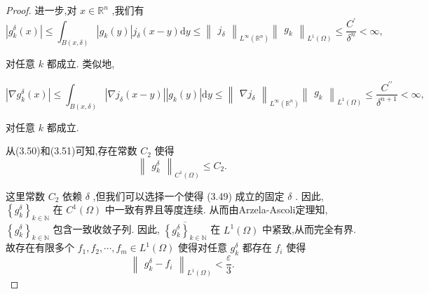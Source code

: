 \documentclass[lang=cn,newtx,10pt,scheme=chinese,thmcnt=chapter]{elegantbook}
\newcommand{\dif}{\mathrm{d}}
\begin{document}
\begin{proof}
进一步,对 \(x \in  {\mathbb{R}}^{n}\) ,我们有
\begin{equation}
\left| {{g}_{k}^{\delta }\left( x\right) }\right|  \leqslant  {\int }_{B\left( {x,\delta }\right) }\left| {{g}_{k}\left( y\right) }\right| {j}_{\delta }\left( {x - y}\right) {\dif y}
\leqslant  {\begin{Vmatrix}{j}_{\delta }\end{Vmatrix}}_{{L}^{\infty }\left( {\mathbb{R}}^{n}\right) }{\begin{Vmatrix}{g}_{k}\end{Vmatrix}}_{{L}^{1}\left( \Omega \right) } \leqslant  \frac{{C}^{\prime }}{{\delta }^{n}} < \infty , \label{3.50}
\end{equation}

对任意 \(k\) 都成立. 类似地,

\begin{equation}
\left| {\nabla {g}_{k}^{\delta }\left( x\right) }\right|  \leqslant  {\int }_{B\left( {x,\delta }\right) }\left| {\nabla {j}_{\delta }\left( {x - y}\right) }\right| \left| {{g}_{k}\left( y\right) }\right| {\dif y}
\leqslant  {\begin{Vmatrix}\nabla {j}_{\delta }\end{Vmatrix}}_{{L}^{\infty }\left( {\mathbb{R}}^{n}\right) }{\begin{Vmatrix}{g}_{k}\end{Vmatrix}}_{{L}^{1}\left( \Omega \right) } \leqslant  \frac{{C}^{\prime \prime }}{{\delta }^{n + 1}} < \infty , \label{3.51}
\end{equation}

对任意 \(k\) 都成立.

从(3.50)和(3.51)可知,存在常数 \({C}_{2}\) 使得
\begin{equation}
{\begin{Vmatrix}{g}_{k}^{\delta }\end{Vmatrix}}_{{C}^{1}\left( \Omega \right) } \leqslant  {C}_{2}. \label{3.52}
\end{equation}

这里常数 \({C}_{2}\) 依赖 \(\delta\) ,但我们可以选择一个使得 (3.49) 成立的固定 \(\delta\) . 因此, \({\left\{  {g}_{k}^{\delta }\right\}  }_{k \in  \mathbb{N}}\) 在 \({C}^{1}\left( \Omega \right)\) 中一致有界且等度连续. 从而由Arzela-Ascoli定理知, \({\left\{  {g}_{k}^{\delta }\right\}  }_{k \in  \mathbb{N}}\) 包含一致收敛子列. 因此, \(\overline{{\left\{  {g}_{k}^{\delta }\right\}  }_{k \in  \mathbb{N}}}\) 在 \({L}^{1}\left( \Omega \right)\) 中紧致,从而完全有界. 故存在有限多个 \({f}_{1},{f}_{2},\cdots ,{f}_{m} \in  {L}^{1}\left( \Omega \right)\) 使得对任意 \({g}_{k}^{\delta }\) 都存在 \({f}_{i}\) 使得
\begin{equation}
{\begin{Vmatrix}{g}_{k}^{\delta } - {f}_{i}\end{Vmatrix}}_{{L}^{1}\left( \Omega \right) } < \frac{\varepsilon }{3}. \label{3.53}
\end{equation}


\end{proof}
\end{document}
